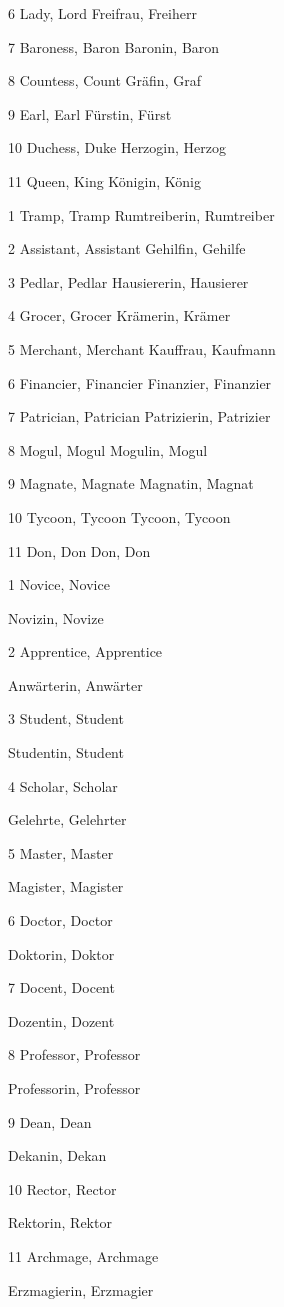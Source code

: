 \documentclass[a4paper,11pt]{book}
\begin{document}
6  Lady, Lord  Freifrau, Freiherr

7  Baroness, Baron  Baronin, Baron

8  Countess, Count  Gräfin, Graf

9  Earl, Earl  Fürstin, Fürst

10  Duchess, Duke  Herzogin, Herzog

11  Queen, King  Königin, König

1  Tramp, Tramp  Rumtreiberin, Rumtreiber

2  Assistant, Assistant  Gehilfin, Gehilfe

3  Pedlar, Pedlar  Hausiererin, Hausierer

4  Grocer, Grocer  Krämerin, Krämer

5  Merchant, Merchant  Kauffrau, Kaufmann

6  Financier, Financier  Finanzier, Finanzier

7  Patrician, Patrician  Patrizierin, Patrizier

8  Mogul, Mogul  Mogulin, Mogul

9  Magnate, Magnate  Magnatin, Magnat

10  Tycoon, Tycoon  Tycoon, Tycoon

11  Don, Don  Don, Don

1  Novice, Novice

Novizin, Novize

2  Apprentice, Apprentice

Anwärterin, Anwärter

3  Student, Student

Studentin, Student

4  Scholar, Scholar

Gelehrte, Gelehrter

5  Master, Master

Magister, Magister

6  Doctor, Doctor

Doktorin, Doktor

7  Docent, Docent

Dozentin, Dozent

8  Professor, Professor

Professorin, Professor

9  Dean, Dean

Dekanin, Dekan

10 Rector, Rector

Rektorin, Rektor

11 Archmage, Archmage

Erzmagierin, Erzmagier
\end{document}
